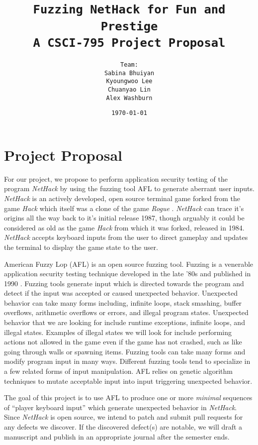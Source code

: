 \documentclass[12pt]{diazessay}
\title{\texttt{\huge{Fuzzing NetHack for Fun and Prestige} \\ {\large A CSCI-795 Project Proposal}}} %
\author{\texttt{{\Huge Team:}\\\vspace*{-0.5em} 
		Sabina Bhuiyan \\\vspace*{-0.5em} 
		Kyoungwoo Lee \\\vspace*{-0.5em}
		Chuanyao Lin \\\vspace*{-0.25em}
		Alex Washburn}} %
\date{\texttt{\today}} %
\begin{document}
\maketitle %

\section*{Project Proposal}

For our project, we propose to perform application security testing of the program \emph{NetHack} \cite{NetHack_page} by using the fuzzing tool AFL \cite{AFL_page} to generate aberrant user inputs. 
\emph{NetHack} is an actively developed, open source terminal game forked from the game \emph{Hack} \cite{Hack} which itself was a clone of the game \emph{Rogue} \cite{Rogue}. 
\emph{NetHack} can trace it's origins all the way back to it's initial release 1987, though arguably it could be considered as old as the game \emph{Hack} from which it was forked, released in 1984. 
\emph{NetHack} accepts keyboard inputs from the user to direct gameplay and updates the terminal to display the game state to the user.

American Fuzzy Lop (AFL) \cite{AFL_page} is an open source fuzzing tool.
Fuzzing is a venerable application security testing technique developed in the late '80s \cite{Barton1988} and published in 1990 \cite{Miller1990}.
Fuzzing tools generate input which is directed towards the program and detect if the input was accepted or caused unexpected behavior.
Unexpected behavior can take many forms including, infinite loops, stack smashing, buffer overflows, arithmetic overflows or errors, and illegal program states.
Unexpected behavior that we are looking for include runtime exceptions, infinite loops, and illegal states.
Examples of illegal states we will look for include performing actions not allowed in the game even if the game has not crashed, such as like going through walls or spawning items.
Fuzzing tools can take many forms and modify program input in many ways.
Different fuzzing tools tend to specialize in a few related forms of input manipulation.
AFL relies on genetic algorithm techniques to mutate acceptable input into input triggering unexpected behavior.

The goal of this project is to use AFL to produce one or more \emph{minimal} sequences of ``player keyboard input'' which generate unexpected behavior in \emph{NetHack}.
Since \emph{NetHack} is open source, we intend to patch and submit pull requests for any defects we discover.
If the discovered defect(s) are notable, we will draft a manuscript and publish in an appropriate journal after the semester ends.
\end{document}
